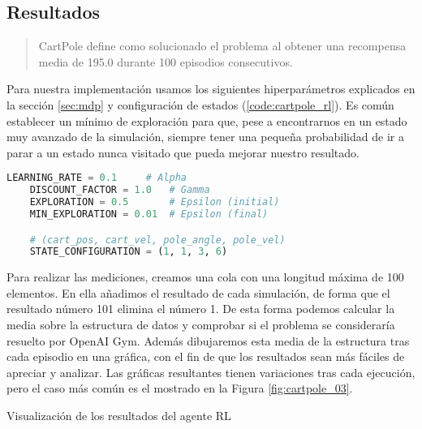 \subsection{Resultados}
\begin{quote}
    CartPole define como solucionado el problema al obtener una recompensa media de 195.0 durante 100 episodios consecutivos.
\end{quote}

Para nuestra implementación usamos los siguientes hiperparámetros explicados en la sección \ref{sec:mdp} y configuración de estados (\ref{code:cartpole_rl}). Es común establecer un mínimo de exploración para que, pese a encontrarnos en un estado muy avanzado de la simulación, siempre tener una pequeña probabilidad de ir a parar a un estado nunca visitado que pueda mejorar nuestro resultado.

\begin{minipage}{0.9\linewidth}%
    \begin{lstlisting}[frame=tb, language=Python, caption=Hiperparámetros y configuración de estados, label=code:cartpole_rl]
    LEARNING_RATE = 0.1     # Alpha
    DISCOUNT_FACTOR = 1.0   # Gamma
    EXPLORATION = 0.5       # Epsilon (initial)
    MIN_EXPLORATION = 0.01  # Epsilon (final)

    # (cart_pos, cart_vel, pole_angle, pole_vel)
    STATE_CONFIGURATION = (1, 1, 3, 6)
    \end{lstlisting}%
\end{minipage}

Para realizar las mediciones, creamos una cola con una longitud máxima de 100 elementos. En ella añadimos el resultado de cada simulación, de forma que el resultado número 101 elimina el número 1. De esta forma podemos calcular la media sobre la estructura de datos y comprobar si el problema se consideraría resuelto por OpenAI Gym. Además dibujaremos esta media de la estructura tras cada episodio en una gráfica, con el fin de que los resultados sean más fáciles de apreciar y analizar. Las gráficas resultantes tienen variaciones tras cada ejecución, pero el caso más común es el mostrado en la Figura \ref{fig:cartpole_03}.

%
       {Visualización de los resultados del agente RL}

